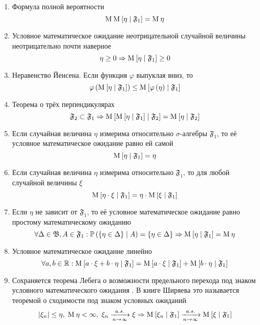 \begin{enumerate}[label=\Roman*]
    \item\label{conditionalExpectationProperty:totalProbability}
        Формула полной вероятности \cite[стр.~144]{BorovkovMS}
        $$\operatorname{M}_{} \operatorname{M}_{} \left[  \eta \;\middle|\; \mathfrak{F}_1  \right] = \operatorname{M}_{} \eta$$
    \item Условное математическое ожидание неотрицательной случайной величины
        неотрицательно почти наверное
        $$\eta \ge 0
            \Rightarrow \operatorname{M}_{} \left[  \eta \;\middle|\; \mathfrak{F}_1  \right] \ge 0$$
    \item\label{conditionalExpectationProperty:Jensen}
        Неравенство Йенсена. Если функция $\varphi$ выпуклая вниз, то
        $$\varphi\left( \operatorname{M}_{} \left[  \eta \;\middle|\; \mathfrak{F}_1  \right] \right)
            \le \operatorname{M}_{} \left[ \varphi\left( \eta \right) \;\middle|\; \mathfrak{F}_1 \right]$$
    \item Теорема о трёх перпендикулярах
        $$\mathfrak{F}_2 \subset \mathfrak{F}_1 \Rightarrow
            \operatorname{M}_{} \left[  \operatorname{M}_{} \left[ \eta \;\middle|\; \mathfrak{F}_1 \right] \;\middle|\; \mathfrak{F}_2 \right]
            = \operatorname{M}_{} \left[  \eta \;\middle|\; \mathfrak{F}_2  \right]$$
    \item\label{conditionalExpectationProperty:measurableRandomVariable}
        Если случайная величина $\eta$ измерима
        относительно $\sigma$-алгебры $\mathfrak{F}_1$,
        то её условное математическое ожидание равно ей самой
        $$\operatorname{M}_{} \left[  \eta \;\middle|\; \mathfrak{F}_1  \right] = \eta$$
    \item\label{conditionalExpectationProperty:measurableProduct}
        Если случайная величина $\eta$ измерима
        относительно $\mathfrak{F}_1$, то для любой случайной величины $\xi$
        $$\operatorname{M}_{} \left[  \eta \cdot \xi \;\middle|\; \mathfrak{F}_1  \right]
            = \eta \cdot \operatorname{M}_{} \left[  \xi \;\middle|\; \mathfrak{F}_1  \right]$$
    \item\label{conditionalExpectationProperty:independence}
        Если $\eta$ не зависит от $\mathfrak{F}_1$,
        то её условное математическое ожидание
        равно простому математическому ожиданию
        $$\forall \Delta \in \mathfrak{B}, A \in \mathfrak{F}_1:
            \mathbb{P}\left(  \left\{ \eta \in \Delta \right\} \;\middle|\; A \right)
                = \left\{ \eta \in \Delta \right\}
            \Rightarrow \operatorname{M}_{} \left[  \eta \;\middle|\; \mathfrak{F}_1  \right]
                = \operatorname{M}_{} \eta$$
    \item\label{conditionalExpectationProperty:linearity}
        Условное математическое ожидание линейно
        $$\forall a, b \in \mathbb{R}:
            \operatorname{M}_{} \left[ a \cdot \xi + b \cdot \eta \;\middle|\; \mathfrak{F}_1 \right]
                = \operatorname{M}_{} \left[ a \cdot \xi \;\middle|\; \mathfrak{F}_1 \right]
                    + \operatorname{M}_{} \left[ b \cdot \eta \;\middle|\; \mathfrak{F}_1 \right]$$
    \item Сохраняется теорема Лебега о возможности предельного перехода
        под знаком условного математического ожидания
        \cite[стр.~302]{KolmogorovFA}.
        В книге Ширяева это называется теоремой о сходимости
        под знаком условных ожиданий \cite[стр.~272]{Shiryayev1}
        $$\left|\xi_n\right| \le \eta,
            \;\operatorname{M}_{} \eta < \infty,
            \;\xi_n \xrightarrow[n\to\infty]{a.s.} \xi
            \Rightarrow
            \operatorname{M}_{} \left[ \xi_n \;\middle|\; \mathfrak{F}_1 \right]
                \xrightarrow[n\to\infty]{a.s.} \operatorname{M}_{} \left[ \xi \;\middle|\; \mathfrak{F}_1 \right]$$
\end{enumerate}


